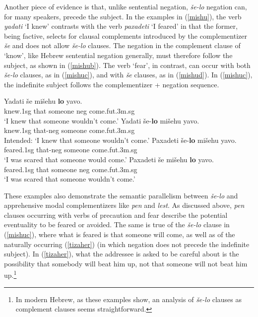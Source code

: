 \documentclass[output=paper,colorlinks,citecolor=brown]{langscibook}
\begin{document}
Another piece of evidence is that, unlike sentential negation, \textit{še-lo} negation can, for many speakers, precede the subject. In the examples in (\ref{mishu}), the verb \textit{yadati} `I knew' contrasts with the verb \textit{paxadeti} `I feared' in that the former, being factive, selects for clausal complements introduced by the complementizer \textit{še} and does not allow \textit{še-lo} clauses. The negation in the complement clause of `know', like Hebrew sentential negation generally, must therefore follow the subject, as shown in (\ref{mishub}). The verb `fear', in contrast, can occur with both \textit{še-lo} clauses, as in (\ref{mishuc}), and with \textit{še} clauses, as in (\ref{mishud}). In (\ref{mishuc}), the indefinite subject follows the complementizer + negation sequence.
\ea
\label{mishu}
\begin{xlist}
\ex\label{mishua}
\gll Yadati še mišehu \textbf{lo} yavo. \\
knew.{\sc 1sg} that someone {\sc neg} come.{\sc fut.3m.sg}  \\
\glt `I knew that someone wouldn't come.'
\ex\label{mishub}
\gll *Yadati še-\textbf{lo} mišehu  yavo. \\
knew.{\sc 1sg} that-{\sc neg} someone come.{\sc fut.3m.sg}  \\
\glt Intended: `I knew that someone wouldn't come.'
\ex\label{mishuc}
\gll Paxadeti še-\textbf{lo} mišehu  yavo. \\
feared.{\sc 1sg} that-{\sc neg} someone come.{\sc fut.3m.sg}  \\
\glt `I was scared that someone would come.'
\ex\label{mishud}
\gll Paxadeti še mišehu \textbf{lo} yavo. \\
feared.{\sc 1sg} that someone {\sc neg} come.{\sc fut.3m.sg}  \\
\glt `I was scared that someone wouldn't come.'
\end{xlist}
\z

These examples also demonstrate the semantic parallelism between \textit{še-lo} and apprehensive modal complementizers like \textit{pen} and \textit{lest}. As discussed above, \textit{pen} clauses occurring with verbs of precaution and fear describe the potential eventuality to be feared or avoided. The same is true of the \textit{še-lo} clause in (\ref{mishuc}), where what is feared is that someone will come, as well as of the naturally occurring (\ref{tizaher}) (in which negation does not precede the indefinite subject). In (\ref{tizaher}), what the addressee is asked to be careful about is the possibility that somebody will beat him up, not that someone will not beat him up.\footnote{In modern Hebrew, as these examples show, an analysis of \textit{še-lo} clauses as complement clauses seems straightforward.}
\end{document}
